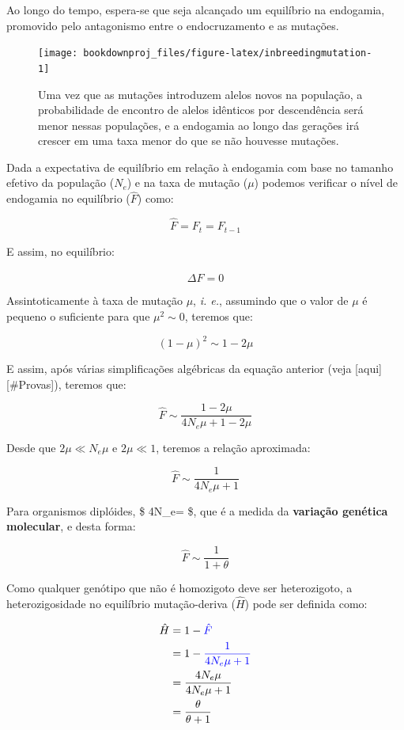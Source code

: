 \documentclass[
]{book}
\begin{document}
Ao longo do tempo, espera-se que seja alcançado um equilíbrio na endogamia, promovido pelo antagonismo entre o endocruzamento e as mutações.

\begin{figure}

{\centering \texttt{[image: bookdownproj\_files/figure-latex/inbreedingmutation-1]} 

}

\caption{Uma vez que as mutações introduzem alelos novos na população, a probabilidade de encontro de alelos idênticos por descendência será menor nessas populações, e a endogamia ao longo das gerações irá crescer em uma taxa menor do que se não houvesse mutações.}\label{fig:inbreedingmutation}
\end{figure}

Dada a expectativa de equilíbrio em relação à endogamia com base no tamanho efetivo da população (\(N_e\)) e na taxa de mutação (\(\mu\)) podemos verificar o nível de endogamia no equilíbrio (\(\hat{F}\)) como:

\[ \hat{F} = F_{t} = F_{t-1}\]

E assim, no equilíbrio:

\[ \Delta \hat{F} = 0\]

Assintoticamente à taxa de mutação \(\mu\), \emph{i. e.}, assumindo que o valor de \(\mu\) é pequeno o suficiente para que \(\mu^2 \sim 0\), teremos que:

\[ (1 - \mu)^2 \sim 1-2\mu\]

E assim, após várias simplificações algébricas da equação anterior (veja {[}aqui{]}{[}\#Provas{]}), teremos que:

\[\hat{F} \sim  \frac{1-2\mu}{4N_e\mu+1-2\mu} \]

Desde que \(2\mu \ll N_e\mu\) e \(2\mu \ll 1\), teremos a relação aproximada:

\[\hat{F} \sim  \frac{1}{4N_e\mu+1} \]

Para organismos diplóides, \$ 4N\_e\mu = \theta\$, que é a medida da \textbf{variação genética molecular}, e desta forma:

\[ \hat{F} \sim \frac{1}{1+\theta} \]

Como qualquer genótipo que não é homozigoto deve ser heterozigoto, a heterozigosidade no equilíbrio mutação-deriva (\(\hat{H}\)) pode ser definida como:

\[
\begin{aligned}
\hat{H}
&= 1 - \color{blue}{\hat{F}} \\
&= 1 - \color{blue}{\frac{1}{4N_e\mu+1}} \\
&= \frac{4N_e\mu}{4N_e\mu+1} \\
&= \frac{\theta}{\theta+1} 
\end{aligned}
\]
\end{document}
